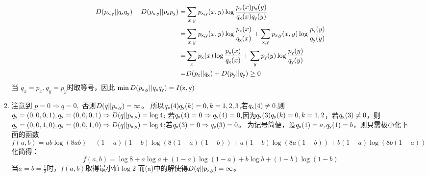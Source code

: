 \documentclass[a4paper]{article}
\begin{document}
\begin{enumerate}[label=\thehwcnt.\arabic*.]
\begin{enumerate}[label=(\alph*)]
   \begin{align*}
   D(p_{\mathsf{x},\mathsf{y}}||q_{\mathsf{x}}q_{\mathsf{y}}) - D(p_{\mathsf{x},\mathsf{y}}||p_{\mathsf{x}}p_{\mathsf{y}}) = & \sum_{x,y}p_{\mathsf{x},\mathsf{y}}(x,y)\log\frac{p_{\mathsf{x}}(x)p_{\mathsf{y}}(y)}{q_{\mathsf{x}}(x)q_{\mathsf{y}}(y)}\\
   = & \sum_{x,y} p_{\mathsf{x},\mathsf{y}}(x,y) \log\frac{p_{\mathsf{x}}(x)}{q_{\mathsf{x}}(x)} + \sum_{\mathsf{x},\mathsf{y}} p_{\mathsf{x},\mathsf{y}}(x,y) \log\frac{p_{\mathsf{y}}(y)}{q_{\mathsf{y}}(y)}\\
   = & \sum_{x} p_{\mathsf{x}}(x) \log\frac{p_{\mathsf{x}}(x)}{q_{\mathsf{x}}(x)} + \sum_{y} p_{\mathsf{y}}(y) \log\frac{p_{\mathsf{y}}(y)}{q_{\mathsf{y}}(y)} \\
   = & D(p_{\mathsf{x}} || q_{\mathsf{x}}) + D(p_{\mathsf{y}} || q_{\mathsf{y}})\geq 0
   \end{align*}
   当 $q_x=p_x,q_y=p_y$时取等号，因此 $\min D(p_{\mathsf{x},\mathsf{y}}||q_{\mathsf{x}}q_{\mathsf{y}})=I(\mathsf{x},\mathsf{y})$
   \item 注意到 $p=0 \Rightarrow q=0,$ 否则$D(q||p_{\mathsf{x},\mathsf{y}})=\infty$。
   所以$q_{\mathsf{x}}(4)q_{\mathsf{y}}(k)=0,k=1,2,3$,若$q_{\mathsf{x}}(4)\neq 0$,则$q_{\mathsf{y}}=(0,0,0,1),q_{\mathsf{x}}=(0,0,0,1)\Rightarrow D(q||p_{\mathsf{x},\mathsf{y}})=\log 4$;
   若$q_{\mathsf{x}}(4)= 0\Rightarrow q_{\mathsf{y}}(4)=0$,因为$q_{\mathsf{x}}(3)q_{\mathsf{y}}(k)=0,k=1,2$，若$q_{\mathsf{x}}(3)\neq 0$，则$q_{\mathsf{y}}=(0,0,1,0),q_{\mathsf{x}}=(0,0,1,0)\Rightarrow D(q||p_{\mathsf{x},\mathsf{y}})=\log 4$;若$q_{\mathsf{x}}(3)=0\Rightarrow q_{\mathsf{y}}(3)=0$。
   为记号简便，设$q_{\mathsf{x}}(1)=a,q_{\mathsf{y}}(1)=b$，则只需极小化下面的函数
\[
f(a,b)=ab\log(8ab)+(1-a)(1-b)\log(8(1-a)(1-b))+a(1-b)\log(8a(1-b))+b(1-a)\log(8b(1-a))
\]
化简得：
\[
f(a,b)=  \log 8 + a\log a +(1-a)\log(1-a) + b\log b +(1-b)\log(1-b)
\]
当$a=b=\frac{1}{2}$时，$f(a,b)$取得最小值$\log 2$
而(a)中的解使得$D(q||p_{\mathsf{x},\mathsf{y}})=\infty$。
   \end{enumerate}

   
  \end{enumerate}
\end{document}
